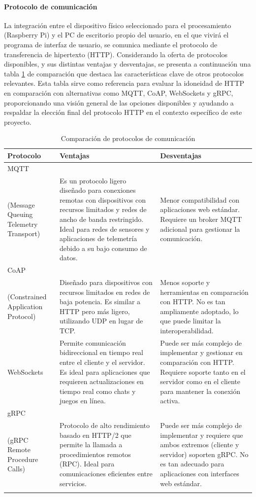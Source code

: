 \paragraph{Protocolo de comunicación}
%
La integración entre el dispositivo físico seleccionado para el procesamiento (Raspberry Pi) y el PC de escritorio propio del usuario, en el que vivirá el programa de interfaz de usuario, se comunica mediante el protocolo de transferencia de hipertexto (HTTP). Considerando la oferta de protocolos disponibles, y sus distintas ventajas y desventajas, se presenta a continuación una tabla \ref{tab:comparacion_protocolos} de comparación que destaca las características clave de otros protocolos relevantes. Esta tabla sirve como referencia para evaluar la idoneidad de HTTP en comparación con alternativas como MQTT, CoAP, WebSockets y gRPC, proporcionando una visión general de las opciones disponibles y ayudando a respaldar la elección final del protocolo HTTP en el contexto específico de este proyecto.\\
%
\begin{longtable}{|m{3cm}|m{6cm}|m{6cm}|}
\hline
\textbf{Protocolo} & \textbf{Ventajas} & \textbf{Desventajas} \\
\hline\raggedright
MQTT\\(Message Queuing Telemetry Transport) & Es un protocolo ligero diseñado para conexiones remotas con dispositivos con recursos limitados y redes de ancho de banda restringido. Ideal para redes de sensores y aplicaciones de telemetría debido a su bajo consumo de datos. & Menor compatibilidad con aplicaciones web estándar. Requiere un broker MQTT adicional para gestionar la comunicación. \\
\hline\raggedright
CoAP\\(Constrained Application Protocol) & Diseñado para dispositivos con recursos limitados en redes de baja potencia. Es similar a HTTP pero más ligero, utilizando UDP en lugar de TCP. & Menos soporte y herramientas en comparación con HTTP. No es tan ampliamente adoptado, lo que puede limitar la interoperabilidad. \\
\hline\raggedright
WebSockets & Permite comunicación bidireccional en tiempo real entre el cliente y el servidor. Es ideal para aplicaciones que requieren actualizaciones en tiempo real como chats y juegos en línea. & Puede ser más complejo de implementar y gestionar en comparación con HTTP. Requiere soporte tanto en el servidor como en el cliente para mantener la conexión activa. \\
\hline\raggedright
gRPC\\(gRPC Remote Procedure Calls) & Protocolo de alto rendimiento basado en HTTP/2 que permite la llamada a procedimientos remotos (RPC). Ideal para comunicaciones eficientes entre servicios. & Puede ser más complejo de implementar y requiere que ambos extremos (cliente y servidor) soporten gRPC. No es tan adecuado para aplicaciones con interfaces web estándar. \\
\hline
\caption{Comparación de protocolos de comunicación}
\label{tab:comparacion_protocolos}
\end{longtable}
